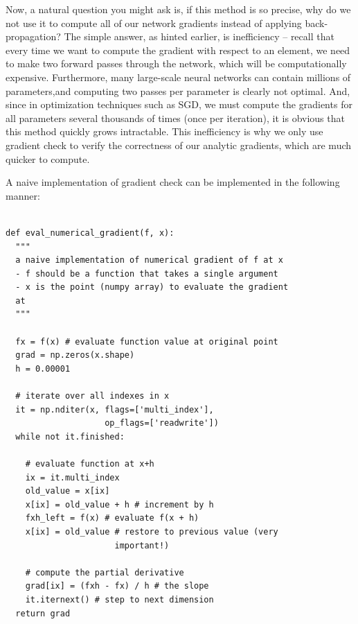\documentclass{tufte-handout}
\begin{document}
Now, a natural question you might ask is, if this method is so precise, why do we not use it to compute all of our network gradients instead of applying back-propagation? The simple answer, as hinted earlier, is inefficiency -- recall that every time we want to compute the gradient with respect to an element, we need to make two forward passes through the network, which will be computationally expensive. Furthermore, many large-scale neural networks can contain millions of parameters,and computing two passes per parameter is clearly not optimal. And, since in optimization techniques such as SGD, we must compute the gradients for all parameters several thousands of times (once per iteration), it is obvious that this method quickly grows intractable. This inefficiency is why we only use gradient check to verify the correctness of our analytic gradients, which are much quicker to compute. 




A naive implementation of gradient check can be implemented in the following manner:
\begin{theorem}
\begin{verbatim}

def eval_numerical_gradient(f, x):
  """ 
  a naive implementation of numerical gradient of f at x 
  - f should be a function that takes a single argument
  - x is the point (numpy array) to evaluate the gradient 
  at
  """ 

  fx = f(x) # evaluate function value at original point
  grad = np.zeros(x.shape)
  h = 0.00001

  # iterate over all indexes in x
  it = np.nditer(x, flags=['multi_index'], 
  	                op_flags=['readwrite'])
  while not it.finished:

    # evaluate function at x+h
    ix = it.multi_index
    old_value = x[ix]
    x[ix] = old_value + h # increment by h
    fxh_left = f(x) # evaluate f(x + h)
    x[ix] = old_value # restore to previous value (very 
    			      important!)

    # compute the partial derivative
    grad[ix] = (fxh - fx) / h # the slope
    it.iternext() # step to next dimension
  return grad  
\end{verbatim}
\label{snip:gradcheck}
\end{theorem}
\end{document}
